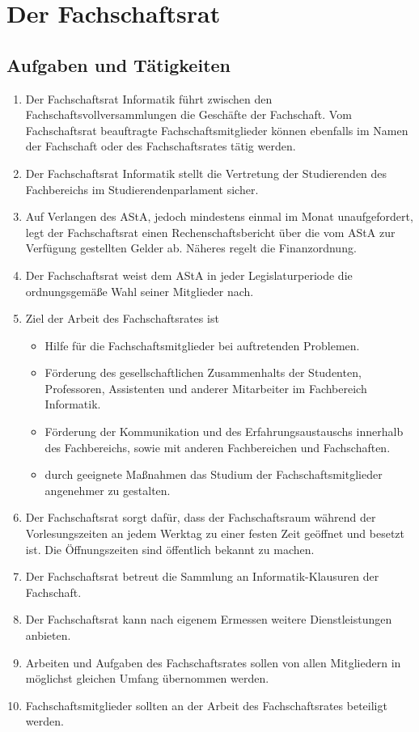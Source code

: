 \section{Der Fachschaftsrat}
\subsection{Aufgaben und Tätigkeiten}
\begin{enumerate}
\item Der Fachschaftsrat Informatik führt zwischen den Fachschaftsvollversammlungen die Geschäfte der Fachschaft. Vom Fachschaftsrat beauftragte Fachschaftsmitglieder können ebenfalls im Namen der Fachschaft oder des Fachschaftsrates tätig werden.
\item Der Fachschaftsrat Informatik stellt die Vertretung der Studierenden des Fachbereichs im Studierendenparlament sicher.
\item Auf Verlangen des AStA, jedoch mindestens einmal im Monat unaufgefordert, legt der Fachschaftsrat einen Rechenschaftsbericht über die vom AStA zur Verfügung gestellten Gelder ab. Näheres regelt die Finanzordnung.
\item Der Fachschaftsrat weist dem AStA in jeder Legislaturperiode die ordnungsgemäße Wahl seiner Mitglieder nach.
\item Ziel der Arbeit des Fachschaftsrates ist
\begin{itemize}
\item Hilfe für die Fachschaftsmitglieder bei auftretenden Problemen.
\item Förderung des gesellschaftlichen Zusammenhalts der Studenten, Professoren, Assistenten und anderer Mitarbeiter im Fachbereich Informatik.
\item Förderung der Kommunikation und des Erfahrungsaustauschs innerhalb des Fachbereichs, sowie mit anderen Fachbereichen und Fachschaften.
\item durch geeignete Maßnahmen das Studium der Fachschaftsmitglieder angenehmer zu gestalten.
\end{itemize}
\item Der Fachschaftsrat sorgt dafür, dass der Fachschaftsraum während der Vorlesungszeiten an jedem Werktag zu einer festen Zeit geöffnet und besetzt ist. Die Öffnungszeiten sind öffentlich bekannt zu machen.
\item Der Fachschaftsrat betreut die Sammlung an Informatik-Klausuren der Fachschaft.
\item Der Fachschaftsrat kann nach eigenem Ermessen weitere Dienstleistungen anbieten.
\item Arbeiten und Aufgaben des Fachschaftsrates sollen von allen Mitgliedern in möglichst gleichen Umfang übernommen werden.
\item Fachschaftsmitglieder sollten an der Arbeit des Fachschaftsrates beteiligt werden.
\end{enumerate}

